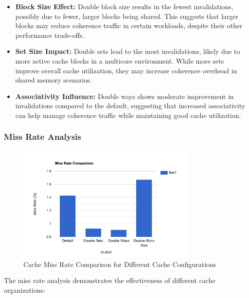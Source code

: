 \documentclass[10pt]{article}
\begin{document}
\begin{itemize}
    \item \textbf{Block Size Effect:} Double block size results in the fewest invalidations, possibly due to fewer, larger blocks being shared. This suggests that larger blocks may reduce coherence traffic in certain workloads, despite their other performance trade-offs.
    
    \item \textbf{Set Size Impact:} Double sets lead to the most invalidations, likely due to more active cache blocks in a multicore environment. While more sets improve overall cache utilization, they may increase coherence overhead in shared memory scenarios.
    
    \item \textbf{Associativity Influence:} Double ways shows moderate improvement in invalidations compared to the default, suggesting that increased associativity can help manage coherence traffic while maintaining good cache utilization.
\end{itemize}

\subsubsection{Miss Rate Analysis}
\begin{figure}[H]
    \centering
    \includegraphics[width=0.8\textwidth]{./images/miss_rate.png}
    \caption{Cache Miss Rate Comparison for Different Cache Configurations}
\end{figure}

The miss rate analysis demonstrates the effectiveness of different cache organizations:
\end{document}
